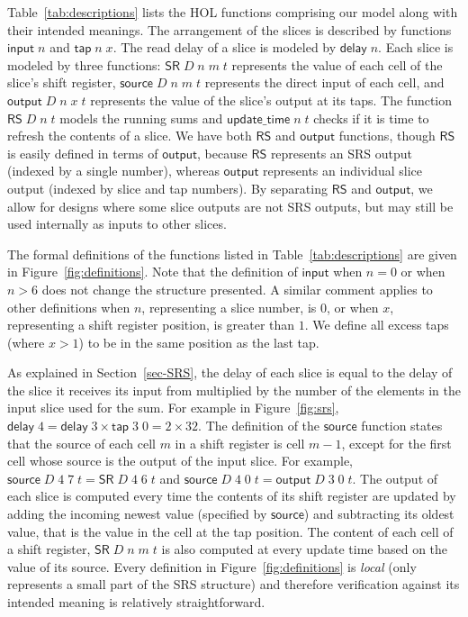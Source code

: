 \documentclass{llncs}
\begin{document}
Table~\ref{tab:descriptions} lists the HOL functions comprising our model along with their intended meanings.
The arrangement of the slices is described by functions $\mathsf{input}\;n$ and $\mathsf{tap}\;n\;x$.
The read delay of a slice is modeled by $\mathsf{delay}\;n$.
Each slice is modeled by three functions: $\mathsf{SR}\;D\;n\;m\;t$ represents the value of each cell of the slice's shift register, $\mathsf{source}\;D\;n\;m\;t$ represents the direct input of each cell, and $\mathsf{output}\;D\;n\;x\;t$ represents the value of the slice's output at its taps.
The function $\mathsf{RS}\;D\;n\;t$ models the running sums and $\mathsf{update\_time}\;n\;t$ checks if it is time to refresh the contents of a slice.
We have both $\mathsf{RS}$ and $\mathsf{output}$ functions, though $\mathsf{RS}$ is easily defined in terms of $\mathsf{output}$, because $\mathsf{RS}$ represents an SRS output (indexed by a single number), whereas $\mathsf{output}$ represents an individual slice output (indexed by slice and tap numbers).
By separating $\mathsf{RS}$ and $\mathsf{output}$, we allow for designs where some slice outputs are not SRS outputs, but may still be used internally as inputs to other slices.

The formal definitions of the functions listed in Table~\ref{tab:descriptions} are given in Figure~\ref{fig:definitions}.
Note that the definition of $\mathsf{input}$ when $n=0$ or when $n>6$ does not change the structure presented.
A similar comment applies to other definitions when $n$, representing a slice number, is $0$, or when $x$, representing a shift register position, is greater than $1$.
We define all excess taps (where $x > 1$) to be in the same position as the last tap.

As explained in Section~\ref{sec-SRS}, the delay of each slice is equal to the delay of the slice it receives its input from multiplied by the number of the elements in the input slice used for the sum.
For example in Figure~\ref{fig:srs}, $\mathsf{delay}\;4 = \mathsf{delay}\;3 \times \mathsf{tap}\;3\;0 = 2 \times 32$.
The definition of the $\mathsf{source}$ function states that the source of each cell $m$ in a shift register is cell $m-1$, except for the first cell whose source is the output of the input slice.
For example, $\mathsf{source}\;D\;4\;7\;t = \mathsf{SR}\;D\;4\;6\;t$ and $\mathsf{source}\;D\;4\;0\;t = \mathsf{output}\;D\;3\;0\;t$.
The output of each slice is computed every time the contents of its shift register are updated by adding the incoming newest value (specified by $\mathsf{source}$) and subtracting its oldest value, that is the value in the cell at the tap position.
The content of each cell of a shift register, $\mathsf{SR}\;D\;n\;m\;t$  is also computed at every update time based on the value of its source.
Every definition in Figure~\ref{fig:definitions} is \emph{local} (only represents a small part of the SRS structure) and therefore verification against its intended meaning is relatively straightforward.
\end{document}
